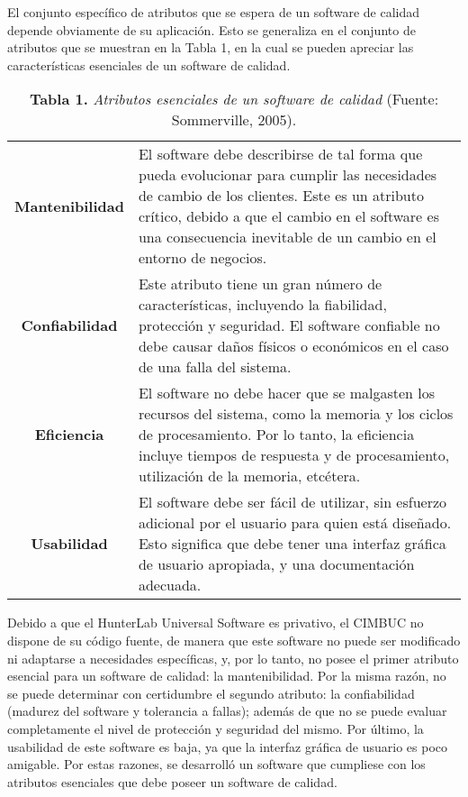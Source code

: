 El conjunto espec\'{i}fico de atributos que se espera de un software de calidad depende obviamente de su aplicaci\'{o}n. Esto se generaliza en el conjunto de atributos que se muestran en la Tabla 1, en la cual se pueden apreciar las caracter\'{i}sticas esenciales de un software de calidad.

\FloatBarrier %
\vfill
		\begin{table}[htb]
			\small
			\caption{\textbf{Tabla 1.} \textit{Atributos esenciales de un software de calidad} (Fuente: Sommerville, 2005).}
			\label{tabla_1}
			\centering
			\setlength{\extrarowheight}{3.5pt}
			\begin{tabulary}{15cm}{|c|J|}
				
				\hline
				 & \\ \hline
			\textbf{Mantenibilidad} & El software debe describirse de tal forma que pueda evolucionar  para cumplir las necesidades de cambio de los 					clientes. Este es un atributo cr\'{i}tico, debido a que el cambio en el software es una consecuencia inevitable de un cambio en el entorno de negocios.\\ \hline
			\textbf{Confiabilidad} & Este atributo tiene un gran n\'{u}mero de caracter\'{i}sticas, incluyendo la fiabilidad, protecci\'{o}n y seguridad. El software confiable no debe causar da\~{n}os f\'{i}sicos o econ\'{o}micos en el caso de una falla del sistema.\\ \hline
			\textbf{Eficiencia} & El software no debe hacer que se malgasten los recursos del sistema, como la memoria y los ciclos de procesamiento. Por lo tanto, la eficiencia incluye tiempos de respuesta y de procesamiento, utilizaci\'{o}n de la memoria, etc\'{e}tera.\\ \hline
			\textbf{Usabilidad} & El software debe ser f\'{a}cil de utilizar, sin esfuerzo adicional por el usuario para quien est\'{a} dise\~{n}ado. Esto significa que debe tener una interfaz gr\'{a}fica de usuario apropiada, y una documentaci\'{o}n adecuada.\\ \hline
			\end{tabulary}
		\end{table}
\vfill
\FloatBarrier %

Debido a que el HunterLab Universal Software es privativo, el CIMBUC no dispone de su c\'{o}digo fuente, de manera que este software no puede ser modificado ni adaptarse a necesidades espec\'{i}ficas, y, por lo tanto, no posee el primer atributo esencial para un software de calidad: la mantenibilidad. Por la misma raz\'{o}n, no se puede determinar con certidumbre el segundo atributo: la confiabilidad (madurez del software y tolerancia a fallas); adem\'{a}s de que no se puede evaluar completamente el nivel de protecci\'{o}n y seguridad del mismo. Por \'{u}ltimo, la usabilidad de este software es baja, ya que la interfaz gr\'{a}fica de usuario es poco amigable. Por estas razones, se desarroll\'{o} un software que cumpliese con los atributos esenciales que debe poseer un software de calidad.

